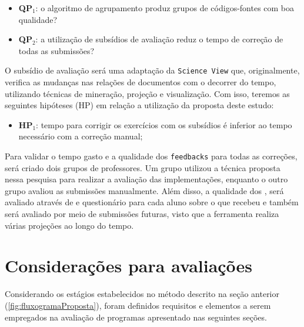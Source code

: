 	 	\begin{itemize}
	 		\item \textbf{QP$_1$}: o algoritmo de agrupamento produz grupos de códigos-fontes
	 		com boa qualidade?
	 		\item \textbf{QP$_2$}: a utilização de subsídios de avaliação reduz o tempo %
	 		de correção de todas as submissões?
	 	\end{itemize}
	 	
	 	O subsídio de avaliação será uma adaptação da \texttt{Science View} \cite{Alencar-etal:2012}
	 	que, originalmente, verifica as mudanças nas relações de documentos com o decorrer do tempo,
	 	utilizando técnicas de mineração, projeção e visualização. Com isso, teremos as
	 	seguintes hipóteses (HP) em relação a utilização da proposta deste estudo:
	 	
	 	\begin{itemize}
	 		\item \textbf{HP$_1$}: tempo para corrigir os exercícios com os subsídios é inferior  %
	 		ao tempo necessário com a correção manual;
	 	\end{itemize}
	 	
	 	Para validar o tempo gasto e a qualidade dos \texttt{feedbacks} para todas as correções,
	 	será criado dois grupos de professores. Um grupo utilizou a técnica proposta nessa pesquisa para
	 	realizar a avaliação das implementações, enquanto o outro grupo avaliou as submissões
	 	manualmente. Além disso, a qualidade dos , será avaliado através de 
	 	e questionário para cada aluno sobre o  que recebeu e também será avaliado
	 	por meio de submissões futuras, visto que a ferramenta realiza várias projeções ao longo do tempo.

	
	\section{Considerações para avaliações}

		
		Considerando os estágios estabelecidos no método descrito na seção anterior
		(\ref{fig:fluxogramaProposta}), foram definidos requisitos e elementos a serem
		empregados na avaliação de programas apresentado nas seguintes seções.

